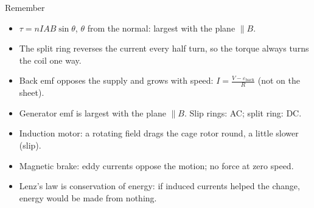 \begin{summarybox}{Remember}
\begin{itemize}
  \item $\tau = nIAB\sin\theta$, $\theta$ from the normal: largest with the plane $\parallel B$.
  \item The split ring reverses the current every half turn, so the torque always turns
        the coil one way.
  \item Back emf opposes the supply and grows with speed:
        $I = \frac{V - \varepsilon_\mathrm{back}}{R}$ (not on the sheet).
  \item Generator emf is largest with the plane $\parallel B$. Slip rings: AC; split ring: DC.
  \item Induction motor: a rotating field drags the cage rotor round, a little slower (slip).
  \item Magnetic brake: eddy currents oppose the motion; no force at zero speed.
  \item Lenz's law is conservation of energy: if induced currents helped the change,
        energy would be made from nothing.
\end{itemize}
\end{summarybox}
